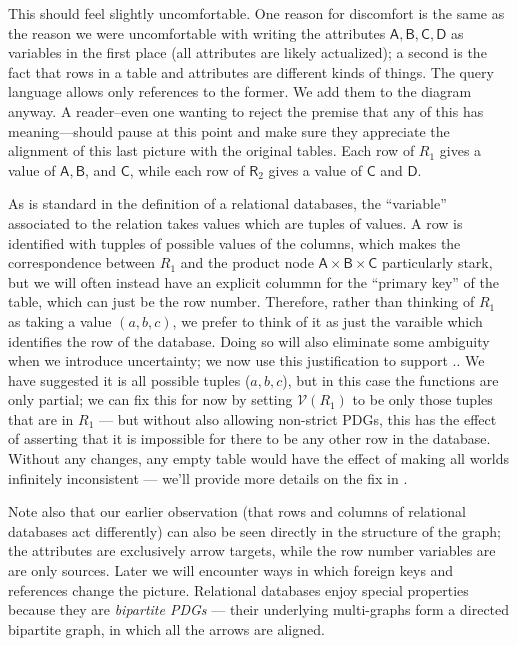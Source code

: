\documentclass{article}
\theoremstyle{definition}
\theoremstyle{remark}
\newcommand{\V}{\mathcal V}
\newcommand{\var}[1]{\mathsf{#1}}
\begin{document}
\begin{example}
    This should feel slightly uncomfortable. One reason for discomfort is the same as the reason we were uncomfortable with writing the attributes $\var{A,B,C,D}$ as variables in the first place (all attributes are likely actualized); a second is the fact that rows in a table and attributes are different kinds of things. The query language allows only references to the former. We add them to the diagram anyway.
    A reader--even one wanting to reject the premise that any of this has meaning---should pause at this point and make sure they appreciate the alignment of this last picture with the original tables. Each row of $R_1$ gives a value of $\var{A,B}$, and $\var C$, while each row of $\var R_2$ gives a value of $\var{C}$ and $\var D$. 
    
    As is standard in the definition of a relational databases, the ``variable'' associated to the relation takes values which are tuples of values. A row is identified with tupples of possible values of the columns, which makes the correspondence between $R_1$ and the product node $\var{A \times B \times C}$ particularly stark, but we will often instead have an explicit colummn for the ``primary key'' of the table, which can just be the row number. Therefore, rather than thinking of $R_1$ as taking a value $(a,b,c)$, we prefer to think of it as just the varaible which identifies the row of the database. Doing so will also eliminate some ambiguity when we introduce uncertainty; we now use this justification to support ..    
    We have suggested it is all possible tuples ($a,b,c$), but in this case the functions are only partial; we can fix this for now by setting $\V(R_1)$ to be only those tuples that are in $R_1$ --- but without also allowing non-strict PDGs, this has the effect of asserting that it is impossible for there to be any other row in the database. Without any changes, any empty table would have the effect of making all worlds infinitely inconsistent --- we'll provide more details on the fix in .
        
    Note also that our earlier observation (that rows and columns of relational databases act differently) can also be seen directly in the structure of the graph; the attributes are exclusively arrow targets, while the row number variables are are only sources. Later we will encounter ways in which foreign keys and references change the picture. Relational databases enjoy special properties because they are \emph{bipartite PDGs} --- their underlying multi-graphs form a directed bipartite graph, in which all the arrows are aligned.
    
    

\end{example}
\end{document}
